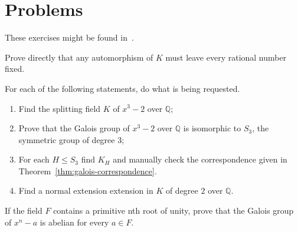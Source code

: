 \section{Problems}\label{sec:problems}

These exercises might be found in~\cite{herstein_topics_2010}.

\begin{problem}\label{problem:6}
Prove directly that any automorphism of $K$ must leave every rational number fixed.
\end{problem}

\begin{problem}\label{problem:17}
For each of the following statements, do what is being requested.
\begin{enumerate}
	\item Find the splitting field $K$ of $x^{3}-2$ over $\mathbb{Q}$;
	\item Prove that the Galois group of $x^{3}-2$ over $\mathbb{Q}$ is isomorphic to $S_{3}$, the symmetric group of degree $3$;
	\item For each ${H}\leqslant{S_{3}}$ find $K_{H}$ and manually check the correspondence given in Theorem~\ref{thm:galois-correspondence}.
	\item Find a normal extension extension in $K$ of degree $2$ over $\mathbb{Q}$.
\end{enumerate}
\end{problem}

\begin{problem}\label{problem:18}
If the field $F$ contains a primitive nth root of unity, prove that the Galois group of $x^{n}-a$ is abelian for every ${a}\in{F}$.
\end{problem}



